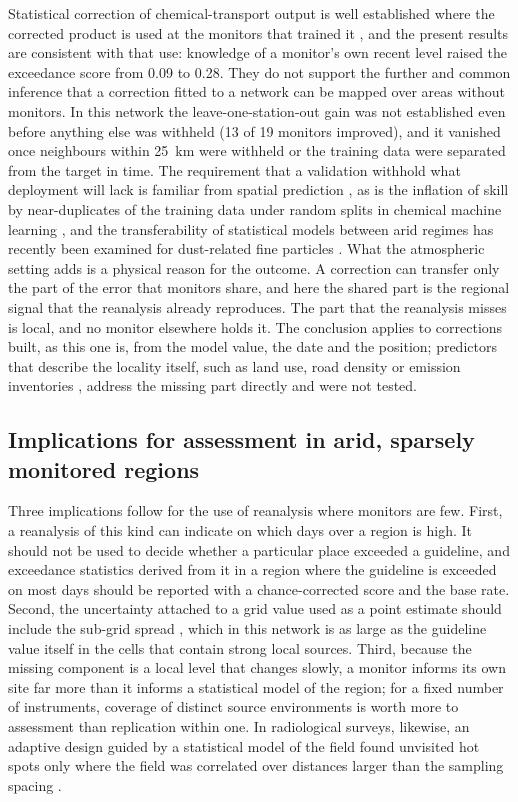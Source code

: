 Statistical correction of chemical-transport output is well established where the corrected
product is used at the monitors that trained it \citep{djalalova2015,huang2017}, and the present
results are consistent with that use: knowledge of a monitor's own recent level raised the
exceedance score from 0.09 to 0.28. They do not support the further and common inference that a
correction fitted to a network can be mapped over areas without monitors. In this network the
leave-one-station-out gain was not established even before anything else was withheld (13 of 19
monitors improved), and it vanished once neighbours within 25~km were withheld or the training data
were separated from the target in time.
The requirement that a validation withhold what deployment will lack is familiar from
spatial prediction \citep{roberts2017,ploton2020,wadoux2021}, as is the inflation of skill by
near-duplicates of the training data under random splits in chemical machine learning
\citep{kim2026tas2r}, and the transferability of
statistical models between arid regimes has recently been examined for dust-related fine
particles \citep{hurynovich2026}. What the atmospheric setting adds is a physical reason for the
outcome. A correction can transfer only the part of the error that monitors share, and here the
shared part is the regional signal that the reanalysis already reproduces. The part that the
reanalysis misses is local, and no monitor elsewhere holds it. The conclusion applies to
corrections built, as this one is, from the model value, the date and the position; predictors
that describe the locality itself, such as land use, road density or emission inventories
\citep{zhang2018lur}, address the missing part directly and were not tested.

\subsection{Implications for assessment in arid, sparsely monitored regions}

Three implications follow for the use of reanalysis \pmten{} where monitors are few. First, a
reanalysis of this kind can indicate on which days \pmten{} over a region is high. It should not
be used to decide whether a particular place exceeded a guideline, and exceedance statistics
derived from it in a region where the guideline is exceeded on most days should be reported with
a chance-corrected score and the base rate. Second, the uncertainty attached to a grid value
used as a point estimate should include the sub-grid spread \citep{denby2011}, which in this network is as large
as the guideline value itself in the cells that contain strong local sources. Third, because the
missing component is a local level that changes slowly, a monitor informs its own site far more
than it informs a statistical model of the region; for a fixed number of instruments, coverage
of distinct source environments is worth more to assessment than replication within one. In
radiological surveys, likewise, an adaptive design guided by a statistical model of the field
found unvisited hot spots only where the field was correlated over distances larger than the
sampling spacing \citep{choi2027adaptive}.

